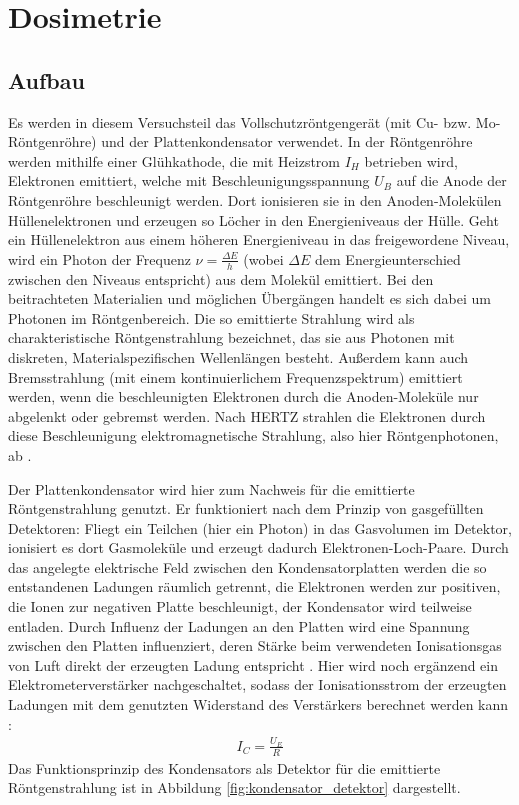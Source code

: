\chapter{Dosimetrie} \label{sec:dosimetrie}

\section{Aufbau}

Es werden in diesem Versuchsteil das Vollschutzröntgengerät (mit Cu- bzw. Mo-Röntgenröhre) und der Plattenkondensator verwendet. In der Röntgenröhre werden mithilfe einer Glühkathode, die mit Heizstrom $I_H$ betrieben wird, Elektronen emittiert, welche mit Beschleunigungsspannung $U_B$ auf die Anode der Röntgenröhre beschleunigt werden. Dort ionisieren sie in den Anoden-Molekülen Hüllenelektronen und erzeugen so Löcher in den Energieniveaus der Hülle. Geht ein Hüllenelektron aus einem höheren Energieniveau in das freigewordene Niveau, wird ein Photon der Frequenz $\nu = \frac{\Delta E}{h}$ (wobei $\Delta E$ dem Energieunterschied zwischen den Niveaus entspricht) aus dem Molekül emittiert. Bei den beitrachteten Materialien und möglichen Übergängen handelt es sich dabei um Photonen im Röntgenbereich. Die so emittierte Strahlung wird als charakteristische Röntgenstrahlung bezeichnet, das sie aus Photonen mit diskreten, Materialspezifischen Wellenlängen besteht. Außerdem kann auch Bremsstrahlung (mit einem kontinuierlichem Frequenzspektrum) emittiert werden, wenn die beschleunigten Elektronen durch die Anoden-Moleküle nur abgelenkt oder gebremst werden. Nach \uppercase{Hertz} strahlen die Elektronen durch diese Beschleunigung elektromagnetische Strahlung, also hier Röntgenphotonen, ab \cite[333-339]{HakenWolf2013}.

Der Plattenkondensator wird hier zum Nachweis für die emittierte Röntgenstrahlung genutzt. Er funktioniert nach dem Prinzip von gasgefüllten Detektoren: Fliegt ein Teilchen (hier ein Photon) in das Gasvolumen im Detektor, ionisiert es dort Gasmoleküle und erzeugt dadurch Elektronen-Loch-Paare. Durch das angelegte elektrische Feld zwischen den Kondensatorplatten werden die so entstandenen Ladungen räumlich getrennt, die Elektronen werden zur positiven, die Ionen zur negativen Platte beschleunigt, der Kondensator wird teilweise entladen. Durch Influenz der Ladungen an den Platten wird eine Spannung zwischen den Platten influenziert, deren Stärke beim verwendeten Ionisationsgas von Luft direkt der erzeugten Ladung entspricht \cite[179-180]{kolanoskiwermerdetektoren}. Hier wird noch ergänzend ein Elektrometerverstärker nachgeschaltet, sodass der Ionisationsstrom der erzeugten Ladungen mit dem genutzten Widerstand des Verstärkers berechnet werden kann \cite[3]{529va}:
\begin{align} \label{eq:ohm}
I_C = \frac{U_E}{R}
\end{align}
Das Funktionsprinzip des Kondensators als Detektor für die emittierte Röntgenstrahlung ist in Abbildung \ref{fig:kondensator_detektor} dargestellt.

